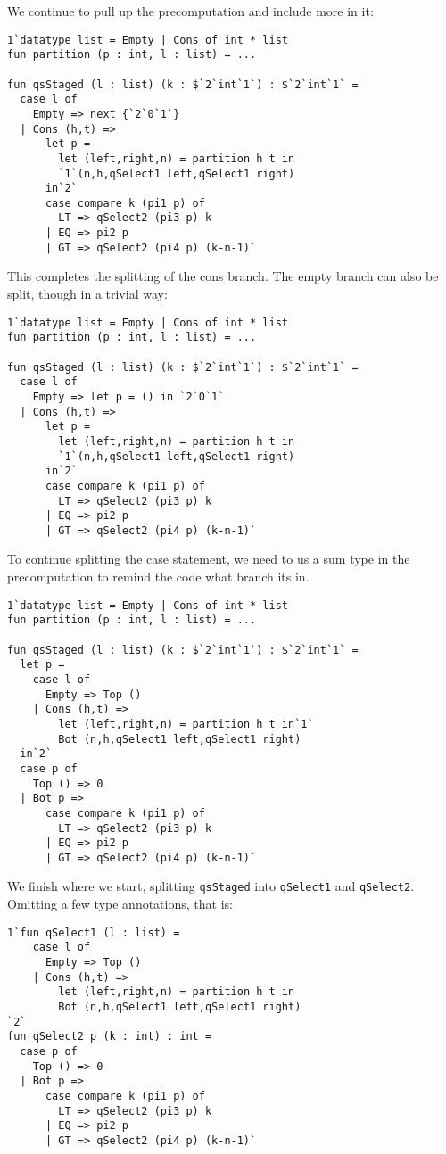 We continue to pull up the precomputation and include more in it:

\begin{lstlisting} 
1`datatype list = Empty | Cons of int * list
fun partition (p : int, l : list) = ...

fun qsStaged (l : list) (k : $`2`int`1`) : $`2`int`1` = 
  case l of
    Empty => next {`2`0`1`}
  | Cons (h,t) => 
      let p =
        let (left,right,n) = partition h t in
        `1`(n,h,qSelect1 left,qSelect1 right)
      in`2`
      case compare k (pi1 p) of
        LT => qSelect2 (pi3 p) k
      | EQ => pi2 p
      | GT => qSelect2 (pi4 p) (k-n-1)`
\end{lstlisting}

This completes the splitting of the cons branch.  
The empty branch can also be split, though in a trivial way:

\begin{lstlisting} 
1`datatype list = Empty | Cons of int * list
fun partition (p : int, l : list) = ...

fun qsStaged (l : list) (k : $`2`int`1`) : $`2`int`1` = 
  case l of
    Empty => let p = () in `2`0`1`
  | Cons (h,t) => 
      let p =
        let (left,right,n) = partition h t in
        `1`(n,h,qSelect1 left,qSelect1 right)
      in`2`
      case compare k (pi1 p) of
        LT => qSelect2 (pi3 p) k
      | EQ => pi2 p
      | GT => qSelect2 (pi4 p) (k-n-1)`
\end{lstlisting}

To continue splitting the case statement, we need to us a sum type in the precomputation
to remind the code what branch its in.

\begin{lstlisting} 
1`datatype list = Empty | Cons of int * list
fun partition (p : int, l : list) = ...

fun qsStaged (l : list) (k : $`2`int`1`) : $`2`int`1` = 
  let p = 
    case l of
      Empty => Top ()
    | Cons (h,t) =>
        let (left,right,n) = partition h t in`1`
        Bot (n,h,qSelect1 left,qSelect1 right)
  in`2`
  case p of 
    Top () => 0
  | Bot p => 
      case compare k (pi1 p) of
        LT => qSelect2 (pi3 p) k
      | EQ => pi2 p
      | GT => qSelect2 (pi4 p) (k-n-1)`
\end{lstlisting}

We finish where we start, splitting \texttt{qsStaged} into
\texttt{qSelect1} and \texttt{qSelect2}.  
Omitting a few type annotations, that is:

\begin{lstlisting} 
1`fun qSelect1 (l : list) = 
    case l of
      Empty => Top ()
    | Cons (h,t) =>
        let (left,right,n) = partition h t in
        Bot (n,h,qSelect1 left,qSelect1 right)
`2`
fun qSelect2 p (k : int) : int = 
  case p of 
    Top () => 0
  | Bot p => 
      case compare k (pi1 p) of
        LT => qSelect2 (pi3 p) k
      | EQ => pi2 p
      | GT => qSelect2 (pi4 p) (k-n-1)`
\end{lstlisting}